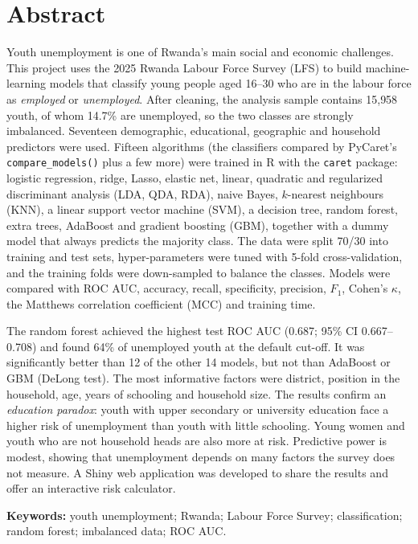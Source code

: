 \documentclass[11pt,a4paper]{article}
\begin{document}
\section*{Abstract}
Youth unemployment is one of Rwanda's main social and economic challenges. This project uses the
2025 Rwanda Labour Force Survey (LFS) to build machine-learning models that classify young people
aged 16--30 who are in the labour force as \emph{employed} or \emph{unemployed}. After cleaning, the
analysis sample contains 15{,}958 youth, of whom 14.7\% are unemployed, so the two classes are
strongly imbalanced. Seventeen demographic, educational, geographic and household predictors were
used. Fifteen algorithms (the classifiers compared by PyCaret's \texttt{compare\_models()} plus a few
more) were trained in R with the \texttt{caret} package: logistic regression, ridge, Lasso, elastic
net, linear, quadratic and regularized discriminant analysis (LDA, QDA, RDA), naive Bayes,
$k$-nearest neighbours (KNN), a linear support vector machine (SVM), a decision tree, random forest,
extra trees, AdaBoost and gradient boosting (GBM), together with a dummy model that always predicts
the majority class. The data were split 70/30 into training and test sets, hyper-parameters were
tuned with 5-fold cross-validation, and the training folds were down-sampled to balance the classes.
Models were compared with ROC AUC, accuracy, recall, specificity, precision, $F_1$, Cohen's $\kappa$,
the Matthews correlation coefficient (MCC) and training time.

The random forest achieved the highest test ROC AUC (0.687; 95\% CI 0.667--0.708) and found 64\% of
unemployed youth at the default cut-off. It was significantly better than 12 of the other 14 models,
but not than AdaBoost or GBM (DeLong test). The most informative factors were district, position in the
household, age, years of schooling and household size. The results confirm an \emph{education
paradox}: youth with upper secondary or university education face a higher risk of unemployment than
youth with little schooling. Young women and youth who are not household heads are also more at
risk. Predictive power is modest, showing that unemployment depends on many factors the survey does
not measure. A Shiny web application was developed to share the results and offer an interactive
risk calculator.

\medskip\noindent\textbf{Keywords:} youth unemployment; Rwanda; Labour Force Survey; classification;
random forest; imbalanced data; ROC AUC.
\end{document}
